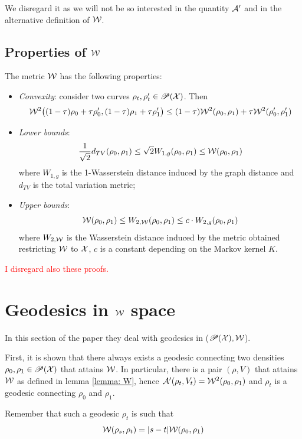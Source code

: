 We disregard it as we will not be so interested in the quantity $\mathcal{A}'$ and in the alternative definition of $\mathcal{W}$.

\subsection{Properties of $\mathcal{W}$}

The metric $\mathcal{W}$ has the following properties:
\begin{itemize}[label=$\circ$]
\vspace{2pt}
    \item \textit{Convexity}: consider two curves $\rho_t,\rho_t' \in \mathscr{P}(\mathcal{X})$. Then
    \[
    \mathcal{W}^2\big((1-\tau)\rho_0+\tau\rho_0',(1-\tau)\rho_1+\tau\rho_1'\big) \le (1-\tau)\mathcal{W}^2(\rho_0,\rho_1) + \tau\mathcal{W}^2(\rho_0',\rho_1')
    \]
    \vspace{2pt}
    \item \textit{Lower bounds}: \[\frac{1}{\sqrt{2}}d_{TV}(\rho_0,\rho_1)\le\sqrt{2}W_{1,g}(\rho_0,\rho_1) \le \mathcal{W}(\rho_0,\rho_1)\] where $W_{1,g}$ is the 1-Wasserstein distance induced by the graph distance and $d_{TV}$ is the total variation metric;
\vspace{10pt}
    \item \textit{Upper bounds}: \[\mathcal{W}(\rho_0,\rho_1) \le W_{2,\mathcal{W}}(\rho_0,\rho_1)\le c \cdot W_{2,g}(\rho_0,\rho_1)\]
    where $W_{2,\mathcal{W}}$ is the Wasserstein distance induced by the metric obtained restricting $\mathcal{W}$ to $\mathcal{X}$, $c$ is a constant depending on the Markov kernel $K$. 

\end{itemize}

\textcolor{red}{I disregard also these proofs.}

\section{Geodesics in $\mathcal{W}$ space}\label{sec: Wgeodesics}
In this section of the paper they deal with geodesics in ($\mathscr{P}(\mathcal{X}),\mathcal{W}$). 

First, it is shown that there always exists a geodesic connecting two densities $\rho_0,\rho_1\in\mathscr{P}(\mathcal{X})$ that attains $\mathcal{W}$. In particular, there is a pair $(\rho,V)$
that attains $\mathcal{W}$ as defined in lemma \ref{lemma: W}, hence $\mathcal{A}'(\rho_t,V_t)=\mathcal{W}^2(\rho_0,\rho_1)$ and $\rho_t$ is a geodesic connecting $\rho_0$ and $\rho_1$.    

Remember that such a geodesic $\rho_t$ is such that 
\[
\mathcal{W}(\rho_s,\rho_t)=|s-t|\mathcal{W}(\rho_0,\rho_1)
\]

